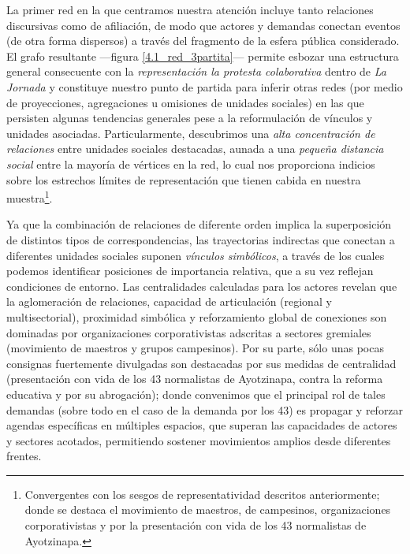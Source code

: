\documentclass[letterpaper, 11pt]{book}
\theoremstyle{definition}
\theoremstyle{remark}
\begin{document}
La primer red en la que centramos nuestra atención incluye tanto relaciones discursivas como de afiliación, de modo que actores y demandas conectan eventos (de otra forma dispersos) a través del fragmento de la esfera pública considerado. 
El grafo resultante ---figura \ref{4.1_red_3partita}--- permite esbozar una estructura general consecuente con la \emph{representación la protesta colaborativa} dentro de \emph{La Jornada} y constituye nuestro punto de partida para inferir otras redes (por medio de proyecciones, agregaciones u omisiones de unidades sociales) en las que persisten algunas tendencias generales pese a la reformulación de vínculos y unidades asociadas. 
Particularmente, descubrimos una \emph{alta concentración de relaciones} entre unidades sociales destacadas, aunada a una \emph{pequeña distancia social} entre la mayoría de vértices en la red, lo cual nos proporciona indicios sobre los estrechos límites de representación que tienen cabida en nuestra muestra\footnote{
    Convergentes con los sesgos de representatividad descritos anteriormente; donde se destaca el movimiento de maestros, de campesinos, organizaciones corporativistas y por la presentación con vida de los 43 normalistas de Ayotzinapa. 
}. %


Ya que la combinación de relaciones de diferente orden implica la superposición de distintos tipos de correspondencias, las trayectorias indirectas que conectan a diferentes unidades sociales suponen \emph{vínculos simbólicos}, a través de los cuales podemos identificar posiciones de importancia relativa, que a su vez reflejan condiciones de entorno. 
Las centralidades calculadas para los actores revelan que la aglomeración de relaciones, capacidad de articulación (regional y multisectorial), proximidad simbólica y reforzamiento global de conexiones son dominadas por organizaciones corporativistas adscritas a sectores gremiales (movimiento de maestros y grupos campesinos). 
Por su parte, sólo unas pocas consignas fuertemente divulgadas son destacadas por sus medidas de centralidad (presentación con vida de los 43 normalistas de Ayotzinapa, contra la reforma educativa y por su abrogación); donde convenimos que el principal rol de tales demandas (sobre todo en el caso de la demanda por los 43) es propagar y reforzar agendas específicas en múltiples espacios, que superan las capacidades de actores y sectores acotados, permitiendo sostener movimientos amplios desde diferentes frentes. 
\end{document}
